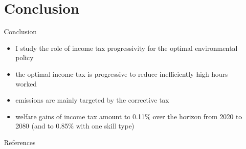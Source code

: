 \documentclass[11pt,aspectratio=169]{beamer}
\begin{document}
\section*{Conclusion}
\begin{frame}{Conclusion}
	\begin{itemize}[<+-| alert@+>]
	\item I study the role of income tax progressivity for the optimal environmental policy %
	\vspace{3mm}
	\item the optimal income tax is progressive to reduce inefficiently high
	hours worked
	\vspace{3mm}
	\item emissions are mainly targeted by the corrective tax
		\vspace{3mm}
	\item welfare gains of income tax amount to 0.11\%  over the horizon from 2020 to 2080 \small{(and to 0.85\% with one skill type)}
   \vspace{3mm}
\end{itemize}
\end{frame}
\begin{frame}[shrink]{References}
	
	
	
\end{frame}



\appendix

\end{document}
